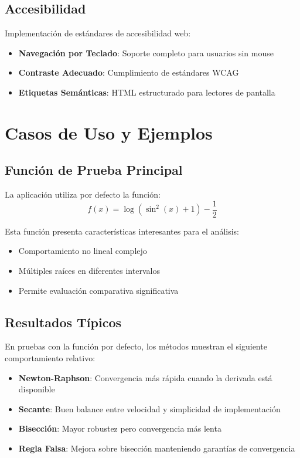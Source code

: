\subsection{Accesibilidad}

Implementación de estándares de accesibilidad web:

\begin{itemize}
    \item \textbf{Navegación por Teclado}: Soporte completo para usuarios sin mouse
    \item \textbf{Contraste Adecuado}: Cumplimiento de estándares WCAG
    \item \textbf{Etiquetas Semánticas}: HTML estructurado para lectores de pantalla
\end{itemize}

\section{Casos de Uso y Ejemplos}

\subsection{Función de Prueba Principal}

La aplicación utiliza por defecto la función:
\[
f(x) = \log(\sin^2(x) + 1) - \frac{1}{2}
\]

Esta función presenta características interesantes para el análisis:
\begin{itemize}
    \item Comportamiento no lineal complejo
    \item Múltiples raíces en diferentes intervalos
    \item Permite evaluación comparativa significativa
\end{itemize}

\subsection{Resultados Típicos}

En pruebas con la función por defecto, los métodos muestran el siguiente comportamiento relativo:

\begin{itemize}
    \item \textbf{Newton-Raphson}: Convergencia más rápida cuando la derivada está disponible
    \item \textbf{Secante}: Buen balance entre velocidad y simplicidad de implementación
    \item \textbf{Bisección}: Mayor robustez pero convergencia más lenta
    \item \textbf{Regla Falsa}: Mejora sobre bisección manteniendo garantías de convergencia
\end{itemize}

